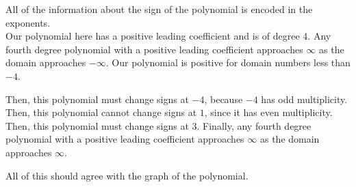 \documentclass{ximera}
\begin{document}
\begin{example}
\begin{image}
  \end{image}




All of the information about the sign of the polynomial is encoded in the exponents. \\


Our polynomial here has a positive leading coefficient and is of degree $4$. Any fourth degree polynomial with a positive leading coefficient approaches $\infty$ as the domain approaches $-\infty$.  Our polynomial is positive for domain numbers less than $-4$.


Then, this polynomial must change signs at $-4$, because $-4$ has odd multiplicity.  Then, this polynomial cannot change signs at $1$, since it has even multiplicity.  Then, this polynomial must change signs at $3$.  Finally, any fourth degree polynomial with a positive leading coefficient approaches $\infty$ as the domain approaches $\infty$.
 


\end{example}

All of this should agree with the graph of the polynomial. \\
\end{document}
